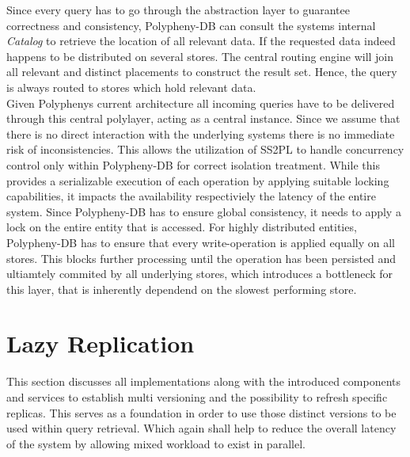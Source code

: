Since every query has to go through the abstraction layer to guarantee correctness 
and consistency, Polypheny-DB can consult the systems internal \textit{Catalog} to retrieve the
location of all relevant data. 
If the requested data indeed happens to be distributed on several stores. The central routing engine will join all relevant and distinct 
placements to construct the result set. Hence, the query is always routed to stores which hold relevant data.\\


Given Polyphenys current architecture all incoming queries have to be delivered through this central polylayer, acting as a central instance.
Since we assume that there is no direct interaction with the underlying systems there is no immediate risk of inconsistencies. 
This allows the utilization of SS2PL to handle concurrency control only within Polypheny-DB for correct isolation treatment.
While this provides a serializable execution of each operation by applying suitable locking capabilities, it impacts the availability respectiviely the latency of the entire system.
Since Polypheny-DB has to ensure global consistency, it needs to apply a lock on the entire entity that is accessed. 
For highly distributed entities, Polypheny-DB has to ensure that every write-operation is applied equally on all stores.
This blocks further processing until the operation has been persisted and ultiamtely commited by all underlying stores,
which introduces a bottleneck for this layer, that is inherently dependend on the slowest performing store.








\section{Lazy Replication}
\label{sec:lazy_replication}

This section discusses all implementations along with the introduced components and services to establish 
multi versioning and the possibility to refresh specific replicas. This serves as a foundation in order to use those distinct versions
to be used within query retrieval. Which again shall help to reduce the overall latency of the system by allowing mixed workload to exist in parallel.\\

